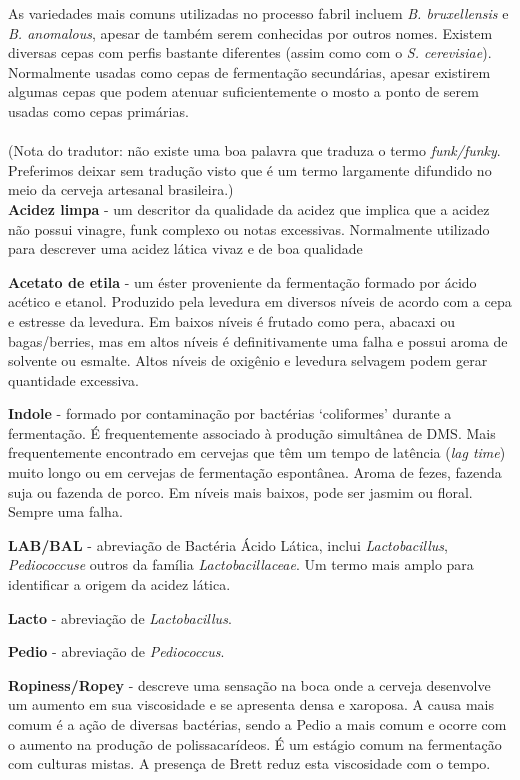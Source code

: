 As variedades mais comuns utilizadas no processo fabril incluem \textit{B. bruxellensis} e \textit{B. anomalous}, apesar de também serem conhecidas por outros nomes. Existem diversas cepas com perfis bastante diferentes (assim como com o \textit{S. cerevisiae}).  Normalmente usadas como cepas de fermentação secundárias, apesar existirem algumas cepas que podem atenuar suficientemente o mosto a ponto de serem usadas como cepas primárias.\\\\
(Nota do tradutor: não existe uma boa palavra que traduza o termo \textit{funk/funky}. Preferimos deixar sem tradução visto que é um termo largamente difundido no meio da cerveja artesanal brasileira.)\\
\textbf{Acidez limpa} - um descritor da qualidade da acidez que implica que a acidez não possui vinagre, funk complexo ou notas excessivas. Normalmente utilizado para descrever uma acidez lática vivaz e de boa qualidade

\textbf{Acetato de etila} - um éster proveniente da fermentação formado por ácido acético e etanol. Produzido pela levedura em diversos níveis de acordo com a cepa e estresse da levedura. Em baixos níveis é frutado como pera, abacaxi ou bagas/berries, mas em altos níveis é definitivamente uma falha e possui aroma de solvente ou esmalte. Altos níveis de oxigênio e levedura selvagem podem gerar quantidade excessiva.

\textbf{Indole} - formado por contaminação por bactérias ‘coliformes’ durante a fermentação. É frequentemente associado à produção simultânea de DMS. Mais frequentemente encontrado em cervejas que têm um tempo de latência (\textit{lag time}) muito longo ou em cervejas de fermentação espontânea. Aroma de fezes, fazenda suja ou fazenda de porco. Em níveis mais baixos, pode ser jasmim ou floral. Sempre uma falha.

\textbf{LAB/BAL} - abreviação de Bactéria Ácido Lática, inclui \textit{Lactobacillus}, \textit{Pediococcuse} outros da família \textit{Lactobacillaceae}. Um termo mais amplo para identificar a origem da acidez lática.

\textbf{Lacto} - abreviação de \textit{Lactobacillus}.

\textbf{Pedio} - abreviação de \textit{Pediococcus}.

\textbf{Ropiness/Ropey} - descreve uma sensação na boca onde a cerveja desenvolve um aumento em sua viscosidade e se apresenta densa e xaroposa. A causa mais comum é a ação de diversas bactérias, sendo a Pedio a mais comum e ocorre com o aumento na produção de polissacarídeos. É um estágio comum na fermentação com culturas mistas. A presença de Brett reduz esta viscosidade com o tempo.

